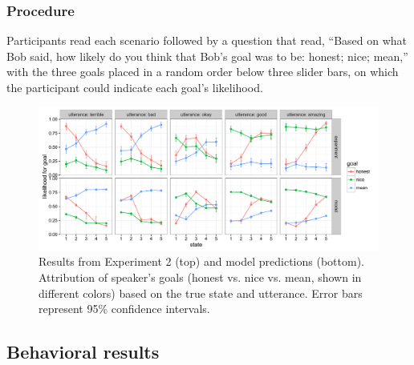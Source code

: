 \documentclass[10pt,letterpaper]{article}
\begin{document}
\subsubsection{Procedure}
Participants read each scenario followed by a question that read, ``Based on what Bob said, how likely do you think that Bob's goal was to be: honest; nice; mean,'' with the three goals placed in a random order below three slider bars, on which the participant could indicate each goal's likelihood.

\begin{figure}[t]
\begin{center} 
  \includegraphics[width=.9\textwidth]{figures/exp2.pdf}
  \caption{\label{fig:exp2} Results from Experiment 2 (top) and model predictions (bottom). Attribution of speaker's goals (honest vs. nice vs. mean, shown in different colors) based on the true state and utterance. Error bars represent 95\% confidence intervals.}
  \end{center} 
\end{figure}

\subsection{Behavioral results}
\end{document}
